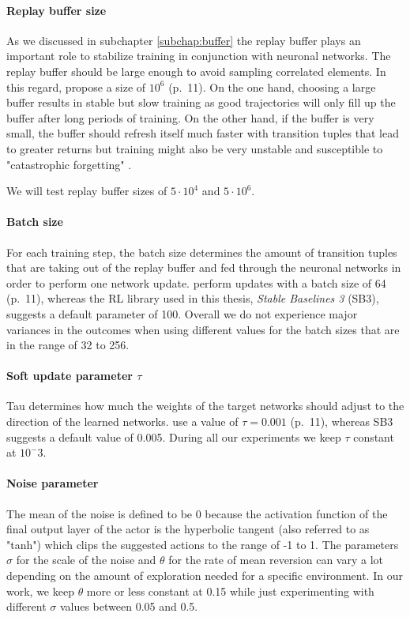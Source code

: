 \paragraph{Replay buffer size}
As we discussed in subchapter \ref{subchap:buffer} the replay buffer plays an important role to stabilize training in conjunction with neuronal networks. The replay buffer should be large enough to avoid sampling correlated elements. In this regard, \cite{lillicrap2019continuous} propose a size of $10^6$ (p.~11). On the one hand, choosing a large buffer results in stable but slow training as good trajectories will only fill up the buffer after long periods of training. On the other hand, if the buffer is very small, the buffer should refresh itself much faster with transition tuples that lead to greater returns but training might also be very unstable and susceptible to "catastrophic forgetting" \cite[]{mccloskey1989catastrophic}.
\par
We will test replay buffer sizes of $5\cdot 10^4$ and $5\cdot 10^6$.

\paragraph{Batch size} For each training step, the batch size determines the amount of transition tuples that are taking out of the replay buffer and fed through the neuronal networks in order to perform one network update. \cite{lillicrap2019continuous} perform updates with a batch size of 64 (p.~11), whereas the RL library used in this thesis, \textit{Stable Baselines 3} (SB3), suggests a default parameter of 100. Overall we do not experience major variances in the outcomes when using different values for the batch sizes that are in the range of 32 to 256. 

\paragraph{Soft update parameter $\tau$} Tau determines how much the weights of the target networks should adjust to the direction of the learned networks. \cite{lillicrap2019continuous} use a value of $\tau = 0.001$ (p.~11), whereas SB3 suggests a default value of 0.005. During all our experiments we keep $\tau$ constant at $10^-3$.

\paragraph{Noise parameter} The mean of the noise is defined to be 0 because the activation function of the final output layer of the actor is the hyperbolic tangent (also referred to as "tanh") which clips the suggested actions to the range of -1 to 1. The parameters $\sigma$ for the scale of the noise and $\theta$ for the rate of mean reversion can vary a lot depending on the amount of exploration needed for a specific environment. In our work, we keep $\theta$ more or less constant at 0.15 while just experimenting with different $\sigma$ values between 0.05 and 0.5. 